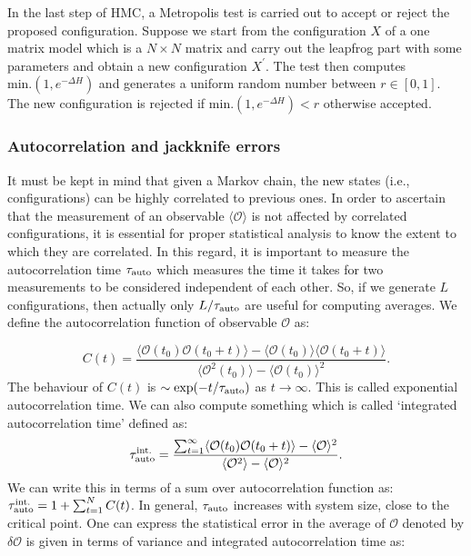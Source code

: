 \documentclass[letter,11pt]{article}
\begin{document}
In the last step of HMC, a Metropolis test is carried out to accept or reject the proposed
configuration. Suppose we start from the configuration $X$ of a one matrix model 
which is a $N \times N$ matrix and carry out the leapfrog part with some parameters and obtain a new configuration 
$X^{\prime}$. The test then computes \texttt{$\text{min.}(1, e^{-\Delta H})$} and generates 
a uniform random number between $r \in [0,1]$. The new configuration is 
rejected if \texttt{$\text{min.}(1, e^{-\Delta H}) < r$} otherwise accepted. 


\subsubsection{Autocorrelation and jackknife errors} 
It must be kept in mind that given a Markov chain, the new states 
(i.e., configurations) can be highly correlated to previous ones. 
In order to ascertain that the measurement of an observable $\langle \mathcal{O} \rangle$ is not affected by correlated configurations, it is essential for proper statistical analysis to know the extent to which they are correlated. In this regard, it is important to measure
the autocorrelation time $ \tau_{\rm{auto}}$ which measures the time it takes for two measurements to be considered independent of each other. So, if we generate $L$ configurations, then actually only $L/\tau_{\rm{auto}}$ are useful for computing averages.
We define the autocorrelation function of observable $\mathcal{O}$ as:
 
 \begin{equation}
 	C(t) = \frac{\langle \mathcal{O}(t_0) \mathcal{O}(t_0 + t) \rangle - \langle \mathcal{O}(t_0)\rangle \langle \mathcal{O}(t_0 + t) \rangle}{\langle \mathcal{O}^2(t_0)\rangle - \langle \mathcal{O}(t_0)\rangle^{2}}.
 \end{equation}
The behaviour of $C(t)$ is $\sim \exp(-t/\tau_{\rm{auto}})$ as $ t \to \infty$. This is called exponential autocorrelation time. We can also compute something which is called `integrated autocorrelation time' defined as:
\begin{equation}
	\tau_{\rm{auto}}^{\rm{int.}} = \frac{\sum_{t=1}^{\infty} \langle \mathcal{O}(t_0) \mathcal{O}(t_0 + t) \rangle - \langle \mathcal{O} \rangle^2 }{\langle \mathcal{O}^2\rangle - \langle \mathcal{O}\rangle^{2}}.
\end{equation}
We can write this in terms of a sum over autocorrelation function as: $\tau_{\rm{auto}}^{\rm{int.}} = 1 + \sum_{t=1}^{N} C(t)$. In general, $ \tau_{\rm{auto}}$ increases with system size, close to the critical point. One 
can express the statistical error in the average of $\mathcal{O}$ denoted 
by $\delta \mathcal{O}$ is given in terms of variance and integrated autocorrelation time as:
\end{document}

